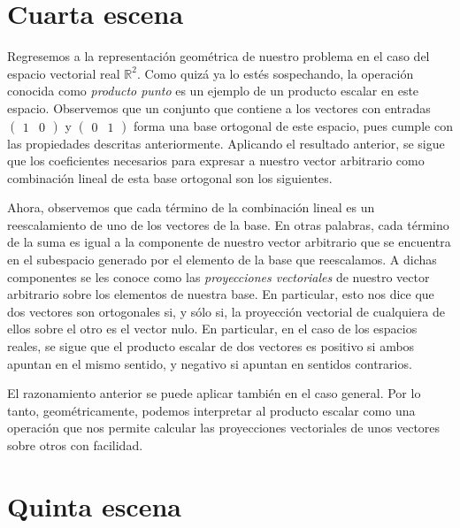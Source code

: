 \documentclass[12pt,dvipsnames]{article}
\numberwithin{equation}{section}
\begin{document}

\newpage
\section{Cuarta escena}

Regresemos a la representación geométrica de nuestro problema en el caso del espacio vectorial real $\mathbb{R}^2$. Como quizá ya lo estés sospechando, la operación conocida como \emph{producto punto} es un ejemplo de un producto escalar en este espacio. Observemos que un conjunto que contiene a los vectores con entradas $\begin{pmatrix} 1 & 0 \end{pmatrix}$ y $\begin{pmatrix} 0 & 1 \end{pmatrix}$ forma una base ortogonal de este espacio, pues cumple con las propiedades descritas anteriormente. Aplicando el resultado anterior, se sigue que los coeficientes necesarios para expresar a nuestro vector arbitrario como combinación lineal de esta base ortogonal son los siguientes.

Ahora, observemos que cada término de la combinación lineal es un reescalamiento de uno de los vectores de la base. En otras palabras, cada término de la suma es igual a la componente de nuestro vector arbitrario que se encuentra en el subespacio generado por el elemento de la base que reescalamos. A dichas componentes se les conoce como las \emph{proyecciones vectoriales} de nuestro vector arbitrario sobre los elementos de nuestra base. En particular, esto nos dice que dos vectores son ortogonales si, y sólo si, la proyección vectorial de cualquiera de ellos sobre el otro es el vector nulo. En particular, en el caso de los espacios reales, se sigue que el producto escalar de dos vectores es positivo si ambos apuntan en el mismo sentido, y negativo si apuntan en sentidos contrarios.

El razonamiento anterior se puede aplicar también en el caso general. Por lo tanto, geométricamente, podemos interpretar al producto escalar como una operación que nos permite calcular las proyecciones vectoriales de unos vectores sobre otros con facilidad.


\newpage
\section{Quinta escena}
\end{document}

